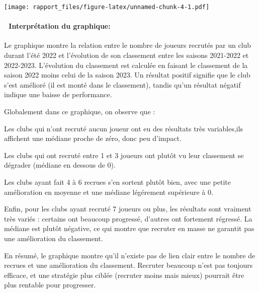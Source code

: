 \documentclass[
]{article}
\begin{document}
\texttt{[image: rapport\_files/figure-latex/unnamed-chunk-4-1.pdf]}

\paragraph{🧠 Interprétation du
graphique:}\label{interpruxe9tation-du-graphique-3}

Le graphique montre la relation entre le nombre de joueurs recrutés par
un club durant l'été 2022 et l'évolution de son classement entre les
saisons 2021-2022 et 2022-2023. L'évolution du classement est calculée
en faisant le classement de la saison 2022 moins celui de la saison
2023. Un résultat positif signifie que le club s'est amélioré (il est
monté dans le classement), tandis qu'un résultat négatif indique une
baisse de performance.

Globalement dans ce graphique, on observe que :

Les clubs qui n'ont recruté aucun joueur ont eu des résultats très
variables,ils affichent une médiane proche de zéro, donc peu d'impact.

Les clubs qui ont recruté entre 1 et 3 joueurs ont plutôt vu leur
classement se dégrader (médiane en dessous de 0).

Les clubs ayant fait 4 à 6 recrues s'en sortent plutôt bien, avec une
petite amélioration en moyenne et une médiane légérement supérieure à 0.

Enfin, pour les clubs ayant recruté 7 joueurs ou plus, les résultats
sont vraiment très variés : certains ont beaucoup progressé, d'autres
ont fortement régressé. La médiane est plutôt négative, ce qui montre
que recruter en masse ne garantit pas une amélioration du classement.

En résumé, le graphique montre qu'il n'existe pas de lien clair entre le
nombre de recrues et une amélioration du classement. Recruter beaucoup
n'est pas toujours efficace, et une stratégie plus ciblée (recruter
moins mais mieux) pourrait être plus rentable pour progresser.
\end{document}
